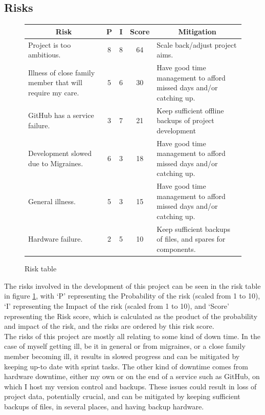 \documentclass[10pt]{article}
\begin{document}
	\medskip
		
	\subsection{Risks}
	\begin{figure}[h]
		\begin{tabular}{ p{4.5cm} | c | c | c | p{4.5cm} }
			\multicolumn{1}{c}{\textbf{Risk}} & \textbf{P} & \textbf{I} & \textbf{Score} & \multicolumn{1}{c}{\textbf{Mitigation}}\\ \hline
			Project is too ambitious. & 8 & 8 & 64 & Scale back/adjust project aims.\\ \hline
						
			Illness of close family member that will require my care. & 5 & 6 & 30 & Have good time management to afford missed days and/or catching up.\\ \hline
			GitHub has a service failure. & 3 & 7 & 21 & Keep sufficient offline backups of project development\\ \hline			 
			Development slowed due to Migraines. & 6 & 3 & 18 & Have good time management to afford missed days and/or catching up.\\ \hline 
			General illness. & 5 & 3 & 15 & Have good time management to afford missed days and/or catching up.\\ \hline
			Hardware failure. & 2 & 5 & 10 & Keep sufficient backups of files, and spares for components.					 
		\end{tabular}		
		\caption{Risk table}
		\label{fig:newRisks}
	\end{figure}
	
	The risks involved in the development of this project can be seen in the risk table in figure \ref{fig:newRisks}, with `P' representing the Probability of the risk (scaled from 1 to 10), `I' representing the Impact of the risk (scaled from 1 to 10), and `Score' representing the Risk score, which is calculated as the product of the probability and impact of the risk, and the risks are ordered by this risk score.\\
	
	The risks of this project are mostly all relating to some kind of down time. In the case of myself getting ill, be it in general or from migraines, or a close family member becoming ill, it results in slowed progress and can be mitigated by keeping up-to date with sprint tasks. The other kind of downtime comes from hardware downtime, either my own or on the end of a service such as GitHub, on which I host my version control and backups. These issues could result in loss of project data, potentially crucial, and can be mitigated by keeping sufficient backups of files, in several places, and having backup hardware.\\		
	
\end{document}
